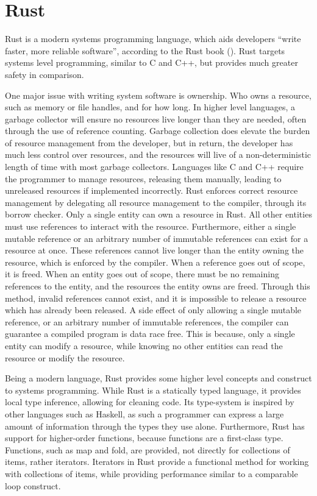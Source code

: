 \section{Rust}\label{sec:rust}
Rust is a modern systems programming language, which aids developers “write faster, more reliable software”, according
to the Rust book (\cite{kalbnik_rustprogramminglanguage_}).
Rust targets systems level programming, similar to C and C++, but provides much greater safety in comparison.

One major issue with writing system software is ownership.
Who owns a resource, such as memory or file handles, and for how long.
In higher level languages, a garbage collector will ensure no resources live longer than they are needed, often through
the use of reference counting.
Garbage collection does elevate the burden of resource management from the developer, but in return, the developer has
much less control over resources, and the resources will live of a non-deterministic length of time with most garbage
collectors.
Languages like C and C++ require the programmer to manage resources, releasing them manually, leading to unreleased
resources if implemented incorrectly.
Rust enforces correct resource management by delegating all resource management to the compiler, through its borrow
checker.
Only a single entity can own a resource in Rust.
All other entities must use references to interact with the resource.
Furthermore, either a single mutable reference or an arbitrary number of immutable references can exist for a resource
at once.
These references cannot live longer than the entity owning the resource, which is enforced by the compiler.
When a reference goes out of scope, it is freed.
When an entity goes out of scope, there must be no remaining references to the entity, and the resources the entity owns
are freed.
Through this method, invalid references cannot exist, and it is impossible to release a resource which has already been
released.
A side effect of only allowing a single mutable reference, or an arbitrary number of immutable references, the compiler
can guarantee a compiled program is data race free.
This is because, only a single entity can modify a resource, while knowing no other entities can read the resource or
modify the resource.

Being a modern language, Rust provides some higher level concepts and construct to systems programming.
While Rust is a statically typed language, it provides local type inference, allowing for cleaning code.
Its type-system is inspired by other languages such as Haskell, as such a programmer can express a large amount of
information through the types they use alone.
Furthermore, Rust has support for higher-order functions, because functions are a first-class type.
Functions, such as map and fold, are provided, not directly for collections of items, rather iterators.
Iterators in Rust provide a functional method for working with collections of items, while providing performance similar
to a comparable loop construct.

